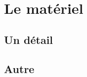 \documentclass{article}
\begin{document}
\tableofcontents
\section{Le mat\'eriel}
\subsection{Un d\'etail}
\subsection{Autre}
\end{document}
